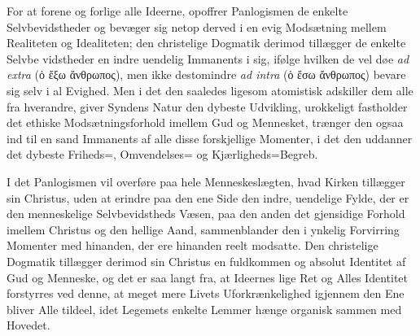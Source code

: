 \documentclass[12pt]{book}
\newcommand{\opage}[1]{\marginnote{\footnotesize\textit{[#1]}}}
\begin{document}
For at forene og forlige alle Ideerne, opoffrer Panlogismen de enkelte
Selvbevidstheder og bevæger sig netop derved i en evig Modsætning mellem
Realiteten og Idealiteten; den christelige Dogmatik derimod tillægger de enkelte
Selvbe\-%
\opage{148}vidstheder en indre uendelig Immanents i sig, ifølge hvilken de vel døe
\textit{ad extra} (ὁ ἔξω ἄνθρωπος), men ikke destomindre \textit{ad intra} (ὁ ἔσω
ἄνθρωπος) bevare sig selv i al Evighed. Men i det den saaledes ligesom
atomistisk adskiller dem alle fra hverandre, giver Syndens Natur den dybeste
Udvikling, urokkeligt fastholder det ethiske Modsætningsforhold imellem Gud og
Mennesket, trænger den ogsaa ind til en sand Immanents af alle disse forskjellige
Momenter, i det den uddanner det dybeste Friheds=, Omvendelses= og
Kjærligheds=Begreb.

I det Panlogismen vil overføre paa hele Menneskeslægten, hvad Kirken tillægger
sin Christus, uden at erindre paa den ene Side den indre, uendelige Fylde, der er
den menneskelige Selvbevidstheds Væsen, paa den anden det gjensidige Forhold
imellem Christus og den hellige Aand, sammenblander den i ynkelig Forvirring
Momenter med hinanden, der ere hinanden reelt modsatte. Den christelige Dogmatik
tillægger derimod sin Christus en fuldkommen og absolut Identitet af Gud og
Menneske, og det er saa langt fra, at Ideernes lige Ret og Alles Identitet
forstyrres ved denne, at meget mere Livets Uforkrænkelighed igjennem den Ene
bliver Alle tildeel, idet Legemets enkelte Lemmer hænge organisk sammen med
Hovedet.
\end{document}
